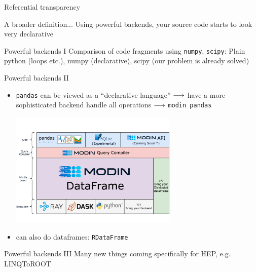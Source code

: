 \begin{frame}{Referential transparency}
	
	
\end{frame}
%
\begin{frame}{A broader definition...}
	Using powerful backends, your source code starts to look very declarative
\end{frame}
%
%
\begin{frame}{Powerful backends I}
	Comparison of code fragments using \texttt{numpy}, \texttt{scipy}: Plain python (loops etc.), numpy (declarative), scipy (our problem is already solved)
\end{frame}
%
%
\begin{frame}{Powerful backends II}
	\begin{itemize}
		\item \texttt{pandas}  can be viewed as a \enquote{declarative language} $\longrightarrow$ have a more sophisticated backend handle all operations $\longrightarrow$ \texttt{modin pandas}
		
		\includegraphics[width=8cm, trim=0cm 2.5cm 0cm 2.5cm, clip]{figures/paradigms/dp/modin_architecture.png}
		\item {} can also do dataframes: \texttt{RDataFrame}
	\end{itemize}
\end{frame}
%
\begin{frame}{Powerful backends III}
	Many new things coming specifically for HEP, e.g. LINQToROOT
\end{frame}